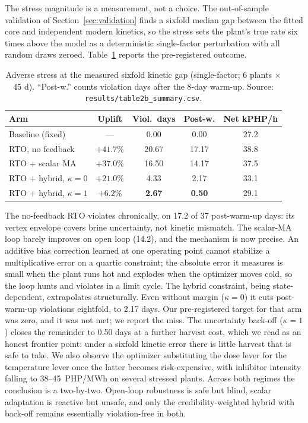 The stress magnitude is a measurement, not a choice. The out-of-sample
validation of Section~\ref{sec:validation} finds a sixfold median gap
between the fitted core and independent modern kinetics, so the stress
sets the plant's true rate six times above the model as a deterministic
single-factor perturbation with all random draws zeroed.
Table~\ref{tab:stress} reports the pre-registered outcome.
\begin{table}[t]\centering
\caption{Adverse stress at the measured sixfold kinetic gap
(single-factor; 6 plants $\times$ 45 d). ``Post-w.'' counts violation
days after the 8-day warm-up. Source:
\texttt{results/table2b\_summary.csv}.}
\label{tab:stress}
\begin{tabular}{lcccc}
\toprule
Arm & Uplift & Viol.\ days & Post-w. & Net kPHP/h \\
\midrule
Baseline (fixed) & --- & 0.00 & 0.00 & 27.2 \\
RTO, no feedback & $+41.7\%$ & 20.67 & 17.17 & 38.8 \\
RTO + scalar MA & $+37.0\%$ & 16.50 & 14.17 & 37.5 \\
RTO + hybrid, $\kappa{=}0$ & $+21.0\%$ & 4.33 & 2.17 & 33.1 \\
RTO + hybrid, $\kappa{=}1$ & $+6.2\%$ & \textbf{2.67} & \textbf{0.50} & 29.1 \\
\bottomrule
\end{tabular}
\end{table}
The no-feedback RTO violates chronically, on 17.2 of 37 post-warm-up
days: its vertex envelope covers brine uncertainty, not kinetic
mismatch. The scalar-MA loop barely improves on open loop (14.2), and
the mechanism is now precise. An additive bias correction learned at
one operating point cannot stabilize a multiplicative error on a
quartic constraint; the absolute error it measures is small when the
plant runs hot and explodes when the optimizer moves cold, so the loop
hunts and violates in a limit cycle. The hybrid constraint, being
state-dependent, extrapolates structurally. Even without margin
($\kappa{=}0$) it cuts post-warm-up violations eightfold, to 2.17 days.
Our pre-registered target for that arm was zero, and it was not met; we
report the miss. The uncertainty back-off ($\kappa{=}1$) closes the
remainder to 0.50 days at a further harvest cost, which we read as an
honest frontier point: under a sixfold kinetic error there is little
harvest that is safe to take. We also observe the optimizer
substituting the dose lever for the temperature lever once the latter
becomes risk-expensive, with inhibitor intensity falling to
38--45~PHP/MWh on several stressed plants. Across both regimes the
conclusion is a two-by-two. Open-loop robustness is safe but blind,
scalar adaptation is reactive but unsafe, and only the
credibility-weighted hybrid with back-off remains essentially
violation-free in both.

